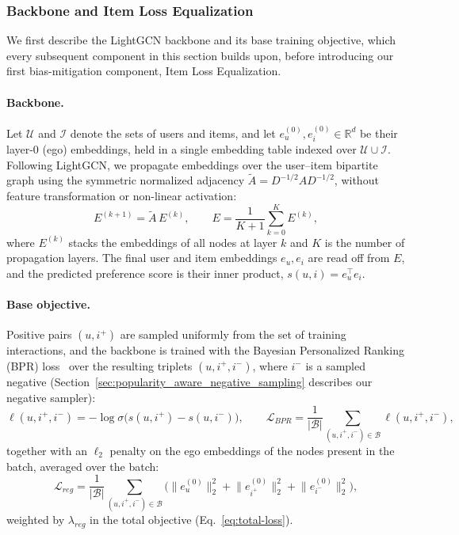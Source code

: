 \subsubsection{Backbone and Item Loss Equalization}
\label{sec:popularity-aware_lightGCN_with_item_loss_equalization}

We first describe the LightGCN backbone and its base training objective, which every
subsequent component in this section builds upon, before introducing our first
bias-mitigation component, Item Loss Equalization.

\paragraph{Backbone.}
Let $\mathcal{U}$ and $\mathcal{I}$ denote the sets of users and items, and let
$e_u^{(0)}, e_i^{(0)} \in \mathbb{R}^d$ be their layer-0 (ego) embeddings, held in a single
embedding table indexed over $\mathcal{U}\cup\mathcal{I}$. Following LightGCN, we propagate
embeddings over the user--item bipartite graph using the symmetric normalized adjacency
$\tilde{A} = D^{-1/2} A D^{-1/2}$, without feature transformation or non-linear activation:
\begin{equation}
    E^{(k+1)} = \tilde{A}\, E^{(k)}, \qquad
    E = \frac{1}{K+1}\sum_{k=0}^{K} E^{(k)},
    \label{eq:lightgcn-propagation}
\end{equation}
where $E^{(k)}$ stacks the embeddings of all nodes at layer $k$ and $K$ is the number of
propagation layers. The final user and item embeddings $e_u, e_i$ are read off from $E$, and
the predicted preference score is their inner product, $s(u,i) = e_u^{\top} e_i$.

\paragraph{Base objective.}
Positive pairs $(u,i^+)$ are sampled uniformly from the set of training interactions, and the
backbone is trained with the Bayesian Personalized Ranking (BPR) loss~\cite{rendle2009bpr}
over the resulting triplets $(u,i^+,i^-)$, where $i^-$ is a sampled negative
(Section~\ref{sec:popularity_aware_negative_sampling} describes our negative sampler):
\begin{equation}
    \ell(u,i^+,i^-) = -\log\sigma\big(s(u,i^+) - s(u,i^-)\big), \qquad
    \mathcal{L}_{BPR} = \frac{1}{|\mathcal{B}|}\sum_{(u,i^+,i^-)\in\mathcal{B}} \ell(u,i^+,i^-),
    \label{eq:bpr}
\end{equation}
together with an $\ell_2$ penalty on the ego embeddings of the nodes present in the batch,
averaged over the batch:
\begin{equation}
    \mathcal{L}_{reg} = \frac{1}{|\mathcal{B}|}\sum_{(u,i^+,i^-)\in\mathcal{B}}
    \Big(\lVert e_u^{(0)}\rVert_2^2 + \lVert e_{i^+}^{(0)}\rVert_2^2 + \lVert e_{i^-}^{(0)}\rVert_2^2\Big),
    \label{eq:l2reg}
\end{equation}
weighted by $\lambda_{reg}$ in the total objective (Eq.~\eqref{eq:total-loss}).

